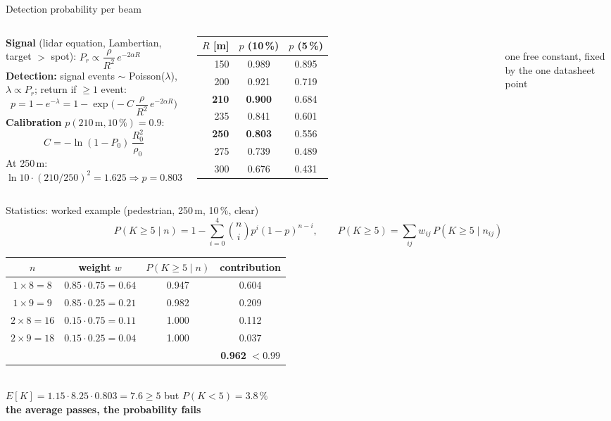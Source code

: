 \documentclass[aspectratio=169,11pt]{beamer}
\newcommand{\fail}[1]{\textcolor{red!70!black}{\textbf{#1}}}
\begin{document}
\begin{frame}{Detection probability per beam}
  \begin{columns}[c]
    \small
    \textbf{Signal} (lidar equation, Lambertian, target $>$ spot):
    $P_r \propto \dfrac{\rho}{R^2}\,e^{-2\alpha R}$\\[0.5em]
    \textbf{Detection:} signal events $\sim$ Poisson($\lambda$), $\lambda \propto P_r$;
    return if $\ge 1$ event:
    \[
      p = 1 - e^{-\lambda} = 1 - \exp\!\Big(-C\,\frac{\rho}{R^2}\,e^{-2\alpha R}\Big)
    \]
    \textbf{Calibration} $p(210\,\text{m}, 10\,\%) = 0.9$:
    \[
      C = -\ln(1-P_0)\,\frac{R_0^2}{\rho_0}
    \]
    At 250\,m: $\ln 10 \cdot (210/250)^2 = 1.625 \Rightarrow p = 0.803$
    \small
    \centering
    \begin{tabular}{rcc}
      \toprule
      $R$ [m] & $p$ (10\,\%) & $p$ (5\,\%) \\
      \midrule
      150 & 0.989 & 0.895 \\
      200 & 0.921 & 0.719 \\
      \textbf{210} & \textbf{0.900} & 0.684 \\
      235 & 0.841 & 0.601 \\
      \textbf{250} & \textbf{0.803} & 0.556 \\
      275 & 0.739 & 0.489 \\
      300 & 0.676 & 0.431 \\
      \bottomrule
    \end{tabular}\\[0.5em]
    \scriptsize one free constant, fixed by the one datasheet point
  \end{columns}
\end{frame}

\begin{frame}{Statistics: worked example (pedestrian, 250\,m, 10\,\%, clear)}
  \small
  \[
    P(K \ge 5 \mid n) = 1 - \sum_{i=0}^{4} \binom{n}{i} p^i (1-p)^{n-i},
    \qquad
    P(K \ge 5) = \sum_{ij} w_{ij}\, P(K\ge5 \mid n_{ij})
  \]
  \centering
  \begin{tabular}{cccc}
    \toprule
    $n$ & weight $w$ & $P(K\ge5\mid n)$ & contribution \\
    \midrule
    $1\times8 = 8$ & $0.85\cdot0.75 = 0.64$ & 0.947 & 0.604 \\
    $1\times9 = 9$ & $0.85\cdot0.25 = 0.21$ & 0.982 & 0.209 \\
    $2\times8 = 16$ & $0.15\cdot0.75 = 0.11$ & 1.000 & 0.112 \\
    $2\times9 = 18$ & $0.15\cdot0.25 = 0.04$ & 1.000 & 0.037 \\
    \midrule
    & & & \fail{0.962} $< 0.99$ \\
    \bottomrule
  \end{tabular}\\[0.8em]
  $E[K] = 1.15 \cdot 8.25 \cdot 0.803 = 7.6 \ge 5$ \quad but \quad $P(K < 5) = 3.8\,\%$\\[0.3em]
  \textbf{the average passes, the probability fails}
\end{frame}
\end{document}
